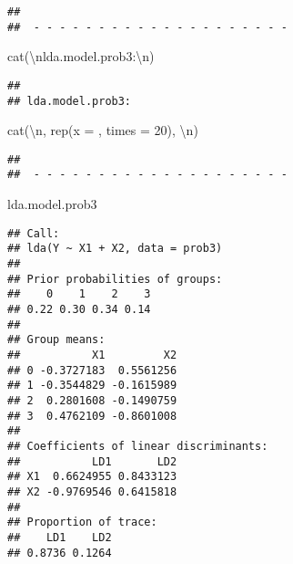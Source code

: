 \documentclass[
]{article}
\newenvironment{Shaded}{\begin{snugshade}}{\end{snugshade}}
\newcommand{\AttributeTok}[1]{\textcolor[rgb]{0.77,0.63,0.00}{#1}}
\newcommand{\DecValTok}[1]{\textcolor[rgb]{0.00,0.00,0.81}{#1}}
\newcommand{\FunctionTok}[1]{\textcolor[rgb]{0.00,0.00,0.00}{#1}}
\newcommand{\NormalTok}[1]{#1}
\newcommand{\SpecialCharTok}[1]{\textcolor[rgb]{0.00,0.00,0.00}{#1}}
\newcommand{\StringTok}[1]{\textcolor[rgb]{0.31,0.60,0.02}{#1}}
\begin{document}
\begin{verbatim}
## 
##  - - - - - - - - - - - - - - - - - - - -
\end{verbatim}

\begin{Shaded}
\begin{Highlighting}[]
\FunctionTok{cat}\NormalTok{(}\StringTok{\textquotesingle{}}\SpecialCharTok{\textbackslash{}n}\StringTok{lda.model.prob3:}\SpecialCharTok{\textbackslash{}n}\StringTok{\textquotesingle{}}\NormalTok{)}
\end{Highlighting}
\end{Shaded}

\begin{verbatim}
## 
## lda.model.prob3:
\end{verbatim}

\begin{Shaded}
\begin{Highlighting}[]
\FunctionTok{cat}\NormalTok{(}\StringTok{\textquotesingle{}}\SpecialCharTok{\textbackslash{}n}\StringTok{\textquotesingle{}}\NormalTok{, }\FunctionTok{rep}\NormalTok{(}\AttributeTok{x =} \StringTok{\textquotesingle{}{-}\textquotesingle{}}\NormalTok{, }\AttributeTok{times =} \DecValTok{20}\NormalTok{), }\StringTok{\textquotesingle{}}\SpecialCharTok{\textbackslash{}n}\StringTok{\textquotesingle{}}\NormalTok{)}
\end{Highlighting}
\end{Shaded}

\begin{verbatim}
## 
##  - - - - - - - - - - - - - - - - - - - -
\end{verbatim}

\begin{Shaded}
\begin{Highlighting}[]
\NormalTok{lda.model.prob3}
\end{Highlighting}
\end{Shaded}

\begin{verbatim}
## Call:
## lda(Y ~ X1 + X2, data = prob3)
## 
## Prior probabilities of groups:
##    0    1    2    3 
## 0.22 0.30 0.34 0.14 
## 
## Group means:
##           X1         X2
## 0 -0.3727183  0.5561256
## 1 -0.3544829 -0.1615989
## 2  0.2801608 -0.1490759
## 3  0.4762109 -0.8601008
## 
## Coefficients of linear discriminants:
##           LD1       LD2
## X1  0.6624955 0.8433123
## X2 -0.9769546 0.6415818
## 
## Proportion of trace:
##    LD1    LD2 
## 0.8736 0.1264
\end{verbatim}
\end{document}
